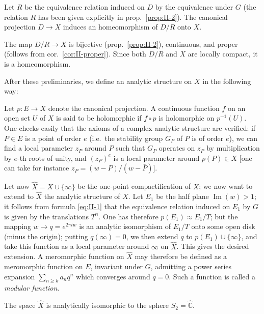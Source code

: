 \begin{corollary}\label{cor:II-homeo}
Let $R$ be the equivalence relation induced on $D$ by the equivalence
under $G$ (the relation $R$ has been given explicitly in prop.\
\ref{prop:II-2}). The canonical projection $D\to X$ induces an
homeomorphism of $D/R$ onto $X$.
\end{corollary}

The map $D/R\longrightarrow X$ is bijective (prop.~\ref{prop:II-2}),
continuous, and proper (follows from cor.~\ref{cor:II-proper}). Since both
$D/R$ and $X$ are locally compact, it is a homeomorphism.

After these preliminaries, we define an analytic structure on $X$ in the
following way:

Let $p:E\longrightarrow X$ denote the canonical projection. A continuous
function $f$ on an open set $U$ of $X$ is said to be holomorphic if
$f\circ p$ is holomorphic on $p^{-1}(U)$. One checks easily that the
axioms of a complex analytic structure are verified: if $P\in E$ is a
point of order $e$ (i.e.\ the stability group $G_{P}$ of $P$ is of order
$e$), we can find a local parameter $z_{P}$ around $P$ such that $G_{P}$
operates on $z_{P}$ by multiplication by $e$-th roots of unity, and
$(z_{P})^{e}$ is a local parameter around $p(P)\in X$ [one can take for
instance $z_{P}=(w-P)/(w-\bar{P})$].

Let now $\hat{X}=X\cup\{\infty\}$ be the one-point compactification of
$X$; we now want to extend to $\hat{X}$ the analytic structure of $X$.
Let $E_{1}$ be the half plane $\operatorname{Im}(w)>1$; it follows from
formula \eqref{eq:II-1} that the equivalence relation induced on $E_{1}$
by $G$ is given by the translations $T^{n}$. One has therefore
$p(E_{1})\approx E_{1}/T$; but the mapping $w\longrightarrow
q=e^{2\pi iw}$ is an analytic isomorphism of $E_{1}/T$ onto some open disk
(minus the origin); putting $q(\infty)=0$, we then extend $q$ to
$p(E_{1})\cup\{\infty\}$, and take this function as a local parameter
around $\infty$ on $\hat{X}$. This gives the desired extension. A
meromorphic function on $\hat{X}$ may therefore be defined as a
meromorphic function on $E$, invariant under $G$, admitting a power series
expansion $\sum_{n\geq k}a_{n}q^{n}$ which converges around $q=0$. Such a
function is called a \emph{modular function}.

\begin{proposition}\label{prop:II-6}
The space $\hat{X}$ is analytically isomorphic to the sphere
$S_{2}=\hat{\mathbb{C}}$.
\end{proposition}

